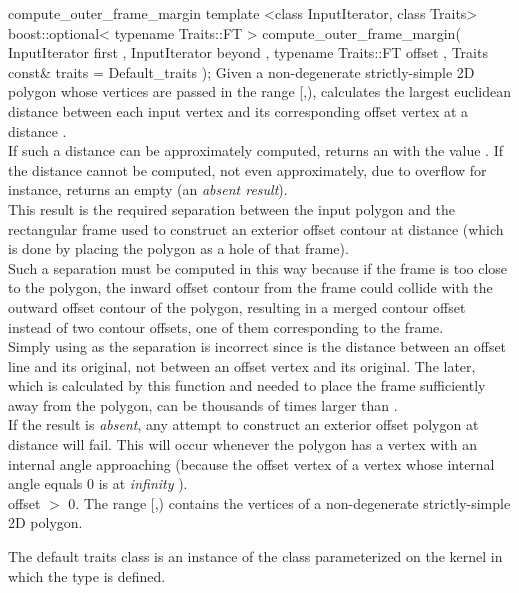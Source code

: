 \begin{ccRefFunction}{compute_outer_frame_margin}
\ccFunction
{template <class InputIterator, class Traits>
boost::optional< typename Traits::FT >
compute_outer_frame_margin( InputIterator       first
                          , InputIterator       beyond
                          , typename Traits::FT offset
                          , Traits const&       traits = Default_traits
                          );
} 
{Given a non-degenerate strictly-simple 2D polygon whose vertices are passed 
in the range [,), calculates the largest euclidean distance
 between each input vertex and its corresponding offset vertex at
a distance .\\
If such a distance can be approximately computed, returns an  with the value . If the distance cannot be computed, not even approximately, due to overflow for instance, returns an empty  (an {\em absent result}).\\
This result is the required separation between the input polygon
and the rectangular frame used to construct an exterior offset contour
at distance  (which is done by placing the polygon as a hole of that frame).\\
Such a separation must be computed in this way because if the frame is 
too close to the polygon, the inward offset contour from the frame could
collide with the outward offset contour of the polygon, resulting in a merged
contour offset instead of two contour offsets, one of them corresponding to the frame.\\
Simply using  as the separation is incorrect since  is the distance 
between an offset line and its original, not between an offset vertex and its original.
The later, which is calculated by this function and needed to place the frame sufficiently
away from the polygon, can be thousands of times larger than .\\
If the result is {\em absent}, any attempt to construct an exterior offset polygon at distance  will fail. This will occur whenever the polygon has a vertex with an internal angle approaching  (because the offset vertex of a vertex whose internal angle equals 0 is at {\em infinity} ).\\
\ccPrecond offset $>$ 0.
\ccPrecond The range [,) contains the vertices
of a non-degenerate strictly-simple 2D polygon.
}

The default traits class  is an instance of the
class  parameterized on
the kernel in which the type  is defined.


\end{ccRefFunction}
